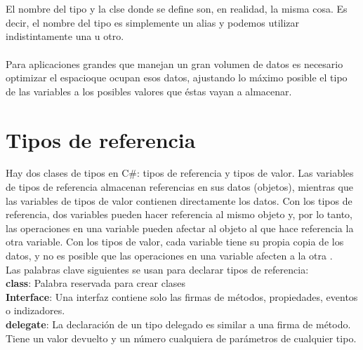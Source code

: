 \documentclass[12pt,a4paper]{report}
\begin{document}
{\\\\El nombre del tipo y la clse donde se define son, en realidad, la misma cosa. Es decir, el nombre del tipo es simplemente un alias y podemos utilizar indistintamente una u otro.\\\\Para aplicaciones grandes que manejan un gran volumen de datos es necesario optimizar el espacioque ocupan esos datos, ajustando lo máximo posible el tipo de las variables a los posibles valores que éstas vayan a almacenar.


\section{Tipos de referencia}
Hay dos clases de tipos en C#: tipos de referencia y tipos de valor. Las variables de tipos de referencia almacenan referencias en sus datos (objetos), mientras que las variables de tipos de valor contienen directamente los datos. Con los tipos de referencia, dos variables pueden hacer referencia al mismo objeto y, por lo tanto, las operaciones en una variable pueden afectar al objeto al que hace referencia la otra variable. Con los tipos de valor, cada variable tiene su propia copia de los datos, y no es posible que las operaciones en una variable afecten a la otra .\\Las palabras clave siguientes se usan para declarar tipos de referencia:\\\textbf{class}: Palabra reservada para crear clases\\\textbf{Interface}: Una interfaz contiene solo las firmas de métodos, propiedades, eventos o indizadores.\\\textbf{delegate}: La declaración de un tipo delegado es similar a una firma de método. Tiene un valor devuelto y un número cualquiera de parámetros de cualquier tipo.
}
\end{document}
